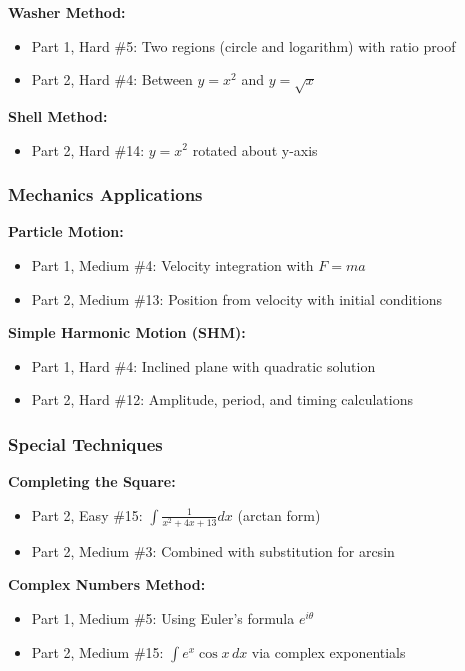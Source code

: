 \textbf{Washer Method:}
\begin{itemize}
  \item Part 1, Hard \#5: Two regions (circle and logarithm) with ratio proof
  \item Part 2, Hard \#4: Between $y=x^2$ and $y=\sqrt{x}$
\end{itemize}

\textbf{Shell Method:}
\begin{itemize}
  \item Part 2, Hard \#14: $y = x^2$ rotated about y-axis
\end{itemize}

\subsubsection*{Mechanics Applications}

\textbf{Particle Motion:}
\begin{itemize}
  \item Part 1, Medium \#4: Velocity integration with $F = ma$
  \item Part 2, Medium \#13: Position from velocity with initial conditions
\end{itemize}

\textbf{Simple Harmonic Motion (SHM):}
\begin{itemize}
  \item Part 1, Hard \#4: Inclined plane with quadratic solution
  \item Part 2, Hard \#12: Amplitude, period, and timing calculations
\end{itemize}

\subsubsection*{Special Techniques}

\textbf{Completing the Square:}
\begin{itemize}
  \item Part 2, Easy \#15: $\int \frac{1}{x^2+4x+13}dx$ (arctan form)
  \item Part 2, Medium \#3: Combined with substitution for arcsin
\end{itemize}

\textbf{Complex Numbers Method:}
\begin{itemize}
  \item Part 1, Medium \#5: Using Euler's formula $e^{i\theta}$
  \item Part 2, Medium \#15: $\int e^x \cos x \, dx$ via complex exponentials
\end{itemize}

